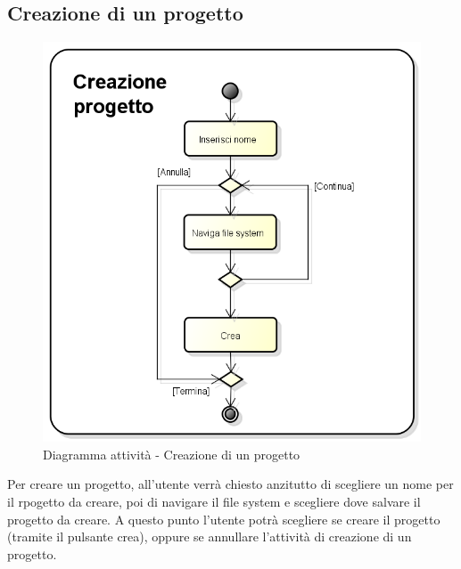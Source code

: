 \subsection{Creazione di un progetto}
\begin{figure}[h] 
	\centering 
	\includegraphics[scale=0.6] {img/activity_creazione.png}
	\caption{Diagramma attività - Creazione di un progetto} 
\end{figure}
Per creare un progetto, all'utente verrà chiesto anzitutto di scegliere un nome per il rpogetto da creare, poi di navigare il file system e scegliere dove salvare il progetto da creare. A questo punto l'utente potrà scegliere se creare il progetto (tramite il pulsante crea), oppure se annullare l'attività di creazione di un progetto.
\newpage



